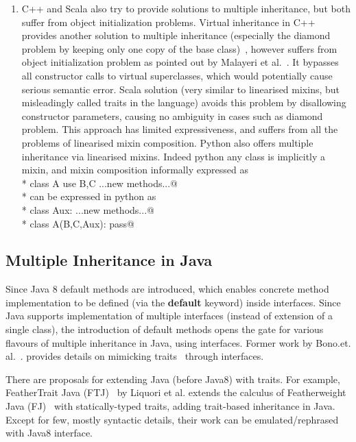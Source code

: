 \begin{enumerate}
\item C++ and Scala also try to provide solutions to multiple inheritance, but both
suffer from object initialization problems. Virtual inheritance in C++ provides
another solution to multiple inheritance (especially the diamond problem by
keeping only one copy of the base class)~\cite{ellis1990annotated}, however
suffers from object initialization problem as pointed out by Malayeri et
al.~\cite{malayeri2009cz}. It bypasses all constructor calls to virtual
superclasses, which would potentially cause serious semantic error. Scala
solution (very similar to linearised mixins, but misleadingly called traits in the language) avoids this problem by disallowing constructor parameters,
causing no ambiguity in cases such as diamond problem. 
This approach has limited expressiveness, and suffers from all the problems of linearised mixin composition.
Python also offers multiple inheritance via linearised mixins. Indeed python any class is implicitly a mixin, and mixin composition informally expressed as\\*
\Q@ class A use B,C {...new methods...}@\\*
can be expressed in python as \\*
\Q@ class Aux: ...new methods...@\\*
\Q@ class A(B,C,Aux):  pass@ 
\end{enumerate}

\subsection{Multiple Inheritance in Java}
Since Java 8 default methods are introduced, which enables concrete method
implementation to be defined (via the \textbf{default} keyword) inside
interfaces. Since Java supports implementation of multiple interfaces (instead of extension of a single
class), the introduction of default methods opens the gate for various flavours of multiple
inheritance in Java, using interfaces. 
Former work by Bono.et. al.~\cite{bono14}.
provides details on mimicking traits~\cite{sharly-thesis} through interfaces.


There are proposals for extending Java (before Java8) with traits. For example, FeatherTrait
Java (FTJ)~\cite{Liquori08ftj} by Liquori et al. extends the calculus of
Featherweight Java (FJ)~\cite{Igarashi01FJ} with statically-typed traits, adding
trait-based inheritance in Java.
Except for few, mostly syntactic details, their work can be emulated/rephrased with Java8 interface.


